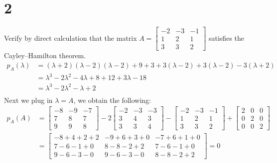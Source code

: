 \documentclass{article}
\begin{document}
\section*{2}
\begin{myleftlinebox}
    Verify by direct calculation that the matrix \(A = \begin{bmatrix}
        -2 & -3 & -1\\
        1 & 2 & 1\\
        3 & 3 & 2
    \end{bmatrix}\) satisfies the Cayley–Hamilton theorem.
    \tcblower
    \begin{equation*}
        \begin{split}
            p_A(\lambda) &= (\lambda+2)(\lambda-2)(\lambda-2)+9+3+3(\lambda-2)+3(\lambda-2)-3(\lambda+2)\\
            &= \lambda^3-2\lambda^2-4\lambda+8+12+3\lambda-18\\
            &= \lambda^3-2\lambda^2-\lambda+2\\
        \end{split}
    \end{equation*}
    Next we plug in \(\lambda=A\), we obtain the following:
    \begin{equation*}
        \begin{split}
            p_A(A) &= \begin{bmatrix}
                -8 & -9 & -7 \\
                7 & 8 & 7\\
                9 & 9 & 8
            \end{bmatrix}-2\begin{bmatrix}
                -2 & -3 & -3\\
                3 & 4 & 3\\
                3 & 3 & 4
            \end{bmatrix}-\begin{bmatrix}
                -2 & -3 & -1\\
                1 & 2 & 1\\
                3 & 3 & 2
            \end{bmatrix}+\begin{bmatrix}
                2 & 0 & 0\\
                0 & 2 & 0\\
                0 & 0 & 2
            \end{bmatrix}\\
            &=\begin{bmatrix}
                -8+4+2+2 & -9+6+3+0 & -7+6+1+0\\
                7-6-1+0 & 8-8-2+2 & 7-6-1+0\\
                9-6-3-0 & 9-6-3-0 & 8-8-2+2    
            \end{bmatrix} = 0
        \end{split}
    \end{equation*}
\end{myleftlinebox}
\end{document}
